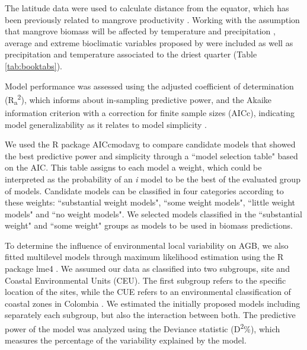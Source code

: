 \documentclass[review, authoryear]{elsarticle}   	%
\begin{document}
The latitude data were used to calculate distance from the equator, which has been previously related to mangrove productivity \citep{Twilley1992, Saenger1993, Komiyama2008128, Wang2013539, Alongi2014}.  Working with the assumption that mangrove biomass will be affected by temperature and precipitation \citep{Komiyama2008128, CONL:CONL12060}, average and extreme bioclimatic variables proposed by \citet{CONL:CONL12060} were included as well as precipitation and temperature associated to the driest quarter (Table \ref{tab:booktabs}). 

Model performance was assessed using the adjusted coefficient of determination (R\textsubscript{a}\textsuperscript{2}), which informs about in-sampling predictive power, and the Akaike information criterion with a correction for finite sample sizes (AICc), indicating model generalizability as it relates to model simplicity \citep{1748-9326-9-10-104013}.

We used the R package AICcmodavg \citep{Mazerolle:2015aa} to compare candidate models that showed the best predictive power and simplicity through a ``model selection table" based on the AIC. This table assigns to each model a weight, which could be interpreted as the probability of an  \emph{i} model to be the best of the evaluated group of models. %
Candidate models can be classified in four categories according to these weights: ``substantial weight models", ``some weight models", ``little weight models" and ``no weight models". We selected models classified in the ``substantial weight"  and ``some weight" groups as models to be used in biomass predictions.  

To determine the influence of environmental local variability on AGB, we also fitted multilevel models through maximum likelihood estimation using the R package lme4 \citep{Bates:2015aa}. We assumed our data as classified into two subgroups, site and Coastal Environmental Units (CEU). The first subgroup refers to the specific location of the sites, while the CUE refers to an environmental classification of coastal zones in Colombia \citep{LopezRodriguez2013}. We estimated the initially proposed models including separately each subgroup, but also the interaction between both. The predictive power of the model was analyzed using the Deviance statistic (D\textsuperscript{2}\%), which measures the percentage of the variability explained by the model. 
\end{document}
